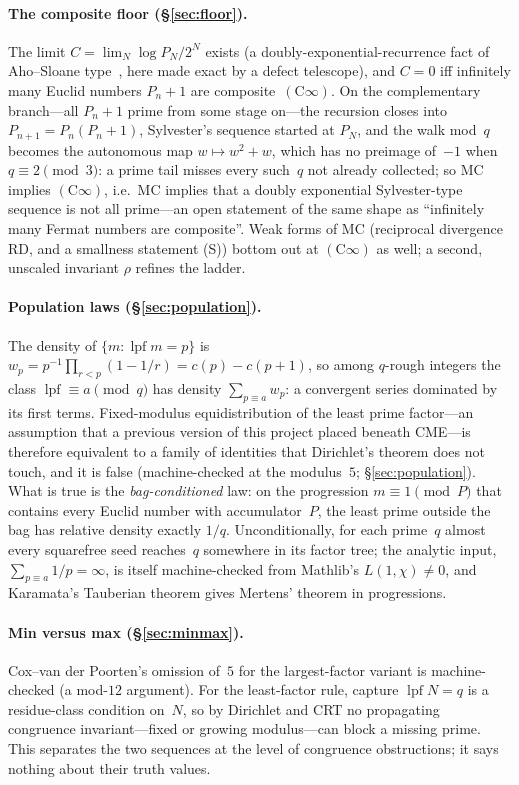 \documentclass[10pt,a4paper]{article}
\newcommand{\lpf}{\operatorname{lpf}}
\newcommand{\Cinf}{(\mathrm{C}\infty)}
\begin{document}
\paragraph{The composite floor (\S\ref{sec:floor}).}  The limit
$C=\lim_N \log P_N/2^{N}$ exists (a doubly-exponential-recurrence fact of
Aho--Sloane type~\cite{AhoSloane1973}, here made exact by a defect
telescope), and $C=0$ iff infinitely many Euclid numbers $P_n+1$ are
composite~$\Cinf$.  On the complementary branch---all $P_n+1$ prime from
some stage on---the recursion closes into $P_{n+1}=P_n(P_n+1)$, Sylvester's
sequence started at $P_N$, and the walk mod~$q$ becomes the autonomous
map $w\mapsto w^2+w$, which has no preimage of~$-1$ when
$q\equiv2\pmod3$: a prime tail misses every such~$q$ not already collected; so
MC implies $\Cinf$, i.e.\ MC implies that a doubly exponential
Sylvester-type sequence is not all prime---an open statement of the same
shape as ``infinitely many Fermat numbers are composite''.  Weak forms of
MC (reciprocal divergence RD, and a smallness statement (S)) bottom out at
$\Cinf$ as well; a second, unscaled invariant $\rho$ refines the ladder.

\paragraph{Population laws (\S\ref{sec:population}).}  The density of
$\{m:\lpf m=p\}$ is $w_p=p^{-1}\prod_{r<p}(1-1/r)=c(p)-c(p{+}1)$, so among
$q$-rough integers the class $\lpf\equiv a\pmod q$ has density
$\sum_{p\equiv a}w_p$: a convergent series dominated by its first terms.
Fixed-modulus equidistribution of the least prime factor---an assumption
that a previous version of this project placed beneath CME---is therefore
equivalent to a family of identities that Dirichlet's theorem does not
touch, and it is false (machine-checked at the modulus~$5$;
\S\ref{sec:population}).  What is true is the \emph{bag-conditioned} law:
on the progression $m\equiv1\pmod P$ that contains every Euclid number
with accumulator~$P$, the least prime outside the bag has relative density
exactly $1/q$.  Unconditionally, for each prime~$q$ almost every squarefree
seed reaches~$q$ somewhere in its factor tree; the analytic input,
$\sum_{p\equiv a}1/p=\infty$, is itself machine-checked from Mathlib's
$L(1,\chi)\ne0$, and Karamata's Tauberian theorem gives Mertens' theorem in
progressions.

\paragraph{Min versus max (\S\ref{sec:minmax}).}  Cox--van der Poorten's
omission of~$5$ for the largest-factor variant is machine-checked (a
mod-$12$ argument).  For the least-factor rule, capture $\lpf N=q$ is a
residue-class condition on~$N$, so by Dirichlet and CRT no propagating
congruence invariant---fixed or growing modulus---can block a missing
prime.  This separates the two sequences at the level of congruence
obstructions; it says nothing about their truth values.
\end{document}
